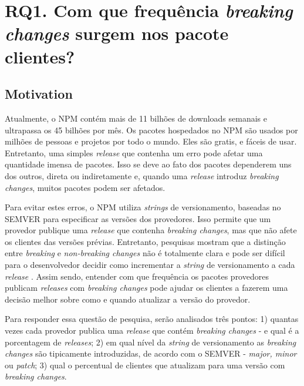 \section{RQ1. Com que frequência \textit{breaking changes} surgem nos pacote clientes?}
\label{sec:rq1}

\subsection{Motivation}
\label{mot:rq1}

Atualmente, o \Gls{NPM} contém mais de 11 bilhões de downloads semanais e ultrapassa os 45 bilhões por mês. Os pacotes hospedados no \Gls{NPM} são usados por milhões de pessoas e projetos por todo o mundo. Eles são gratis, e fáceis de usar. Entretanto, uma simples \textit{release} que contenha um erro pode afetar uma quantidade imensa de pacotes. Isso se deve ao fato dos pacotes dependerem uns dos outros, direta ou indiretamente e, quando uma \textit{release} introduz \textit{breaking changes}, muitos pacotes podem ser afetados.

Para evitar estes erros, o \Gls{NPM} utiliza \textit{strings} de versionamento, baseadas no \Gls{SEMVER} para especificar as versões dos provedores. Isso permite que um provedor publique uma \textit{release} que contenha \textit{breaking changes}, mas que não afete os clientes das versões prévias. Entretanto, pesquisas mostram que a distinção entre \textit{breaking} e \textit{non-breaking changes} não é totalmente clara e pode ser difícil para o desenvolvedor decidir como incrementar a \textit{string} de versionamento a cada \textit{release} \cite{noregrets2018}. Assim sendo, entender com que frequência os pacotes provedores publicam \textit{releases} com \textit{breaking changes} pode ajudar os clientes a fazerem uma decisão melhor sobre como e quando atualizar a versão do provedor.

Para responder essa questão de pesquisa, serão analisados três pontos: 1) quantas vezes cada provedor publica uma \textit{release} que contém \textit{breaking changes} - e qual é a porcentagem de \textit{releases}; 2) em qual nível da \textit{string} de versionamento as \textit{breaking changes} são tipicamente introduzidas, de acordo com o \Gls{SEMVER} - \textit{major, minor} ou \textit{patch}; 3) qual o percentual de clientes que atualizam para uma versão com \textit{breaking changes}.

